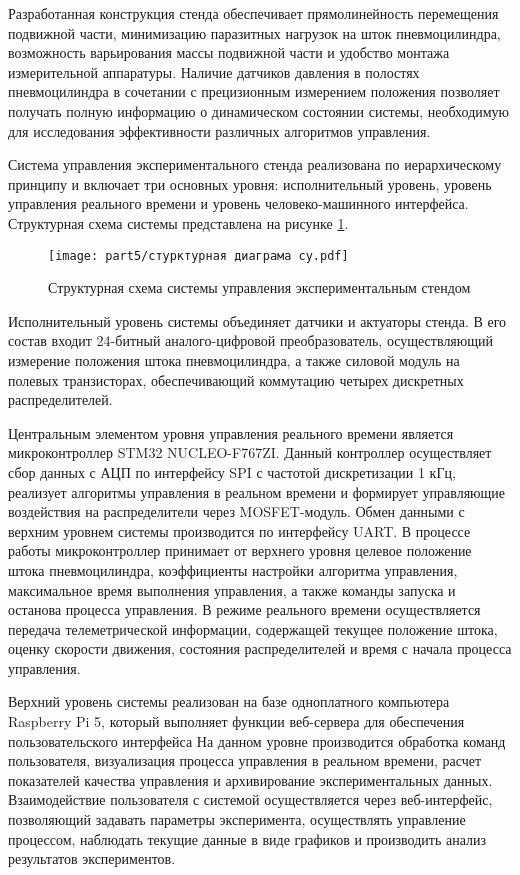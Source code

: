 Разработанная конструкция стенда обеспечивает прямолинейность перемещения подвижной части,
минимизацию паразитных нагрузок на шток пневмоцилиндра, возможность варьирования массы подвижной
части и удобство монтажа измерительной аппаратуры. Наличие датчиков давления в полостях пневмоцилиндра
в сочетании с прецизионным измерением положения позволяет получать полную информацию о динамическом
состоянии системы, необходимую для исследования эффективности различных алгоритмов управления.


Система управления экспериментального стенда реализована по иерархическому принципу и включает три
основных уровня: исполнительный уровень, уровень управления реального времени и уровень человеко-машинного интерфейса.
Структурная схема системы представлена на рисунке \ref{fig:control_system_diagram}.

\begin{figure}[ht]
	\centering
	\texttt{[image: part5/стурктурная диаграма су.pdf]}
	\caption{Структурная схема системы управления экспериментальным стендом}
	\label{fig:control_system_diagram}
\end{figure}

Исполнительный уровень системы объединяет датчики и актуаторы стенда. В его состав входит
24-битный аналого-цифровой преобразователь, осуществляющий измерение положения штока пневмоцилиндра,
а также силовой модуль на полевых транзисторах, обеспечивающий коммутацию четырех дискретных
распределителей.

Центральным элементом уровня управления реального времени является микроконтроллер
STM32 NUCLEO-F767ZI. Данный контроллер осуществляет сбор данных с АЦП по интерфейсу SPI с частотой дискретизации
1 кГц, реализует алгоритмы управления в реальном времени и формирует управляющие воздействия на
распределители через MOSFET-модуль. Обмен данными с верхним уровнем системы производится по
интерфейсу UART. В процессе работы микроконтроллер принимает от верхнего уровня целевое положение
штока пневмоцилиндра, коэффициенты настройки алгоритма управления, максимальное время выполнения
управления, а также команды запуска и останова процесса управления. В режиме реального времени
осуществляется передача телеметрической информации, содержащей текущее положение штока,
оценку скорости движения, состояния распределителей и время с начала процесса управления.

Верхний уровень системы реализован на базе одноплатного компьютера Raspberry Pi 5,
который выполняет функции веб-сервера для обеспечения пользовательского интерфейса
На данном уровне производится обработка команд пользователя, визуализация процесса
управления в реальном времени, расчет показателей качества управления и архивирование
экспериментальных данных. Взаимодействие пользователя с системой осуществляется через веб-интерфейс,
позволяющий задавать параметры эксперимента, осуществлять управление процессом, наблюдать
текущие данные в виде графиков и производить анализ результатов экспериментов.

